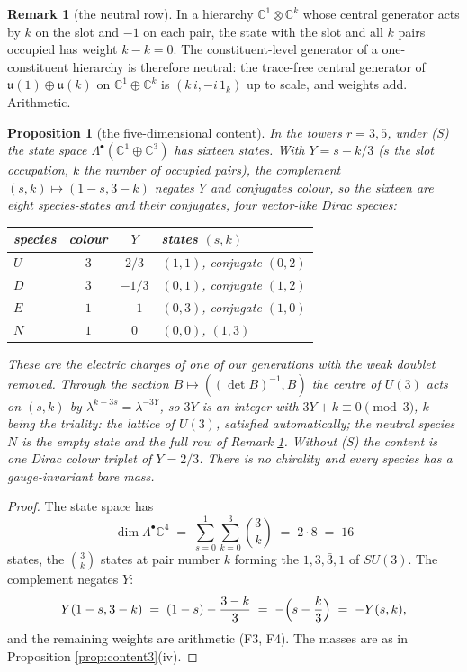 \documentclass[11pt]{article}
\newtheorem{proposition}[theorem]{Proposition}
\theoremstyle{definition}
\newtheorem{remark}[theorem]{Remark}
\newcommand{\C}{\mathbb{C}}
\newcommand{\uu}{\mathfrak{u}}
\begin{document}
\begin{remark}[the neutral row]\label{rem:neutralrow}
In a hierarchy $\C^{1} \otimes \C^{k}$ whose central generator acts by $k$ on the slot and $-1$ on each pair, the state with the slot and all $k$ pairs occupied has weight $k - k = 0$. The constituent-level generator of a one-constituent hierarchy is therefore neutral: the trace-free central generator of $\uu(1) \oplus \uu(k)$ on $\C^{1} \oplus \C^{k}$ is $(k\,i, -i\,1_{k})$ up to scale, and weights add. Arithmetic.
\end{remark}

\begin{proposition}[the five-dimensional content]\label{prop:content5}
In the towers $r = 3, 5$, under (S) the state space $\Lambda^{\bullet}(\C^{1} \oplus \C^{3})$ has sixteen states. With $Y = s - k/3$ ($s$ the slot occupation, $k$ the number of occupied pairs), the complement $(s,k) \mapsto (1-s, 3-k)$ negates $Y$ and conjugates colour, so the sixteen are eight species-states and their conjugates, four vector-like Dirac species:
\begin{center}\small
\begin{tabular}{@{}lccl@{}}
\toprule
species & colour & $Y$ & states $(s,k)$ \\
\midrule
$U$ & $3$ & $2/3$ & $(1,1)$, conjugate $(0,2)$ \\
$D$ & $3$ & $-1/3$ & $(0,1)$, conjugate $(1,2)$ \\
$E$ & $1$ & $-1$ & $(0,3)$, conjugate $(1,0)$ \\
$N$ & $1$ & $0$ & $(0,0)$, $(1,3)$ \\
\bottomrule
\end{tabular}
\end{center}
These are the electric charges of one of our generations with the weak doublet removed. Through the section $B \mapsto ((\det B)^{-1}, B)$ the centre of $U(3)$ acts on $(s,k)$ by $\lambda^{k - 3s} = \lambda^{-3Y}$, so $3Y$ is an integer with $3Y + k \equiv 0 \pmod 3$, $k$ being the triality: the lattice of $U(3)$, satisfied automatically; the neutral species $N$ is the empty state and the full row of Remark \ref{rem:neutralrow}. Without (S) the content is one Dirac colour triplet of $Y = 2/3$. There is no chirality and every species has a gauge-invariant bare mass.
\end{proposition}

\begin{proof}
The state space has
\[
\dim \Lambda^{\bullet}\C^{4} \;=\; \sum_{s=0}^{1}\sum_{k=0}^{3}\binom{3}{k} \;=\; 2 \cdot 8 \;=\; 16
\]
states, the $\binom{3}{k}$ states at pair number $k$ forming the $1, 3, \bar{3}, 1$ of $SU(3)$. The complement negates $Y$:
\[
Y(1 - s, 3 - k) \;=\; (1 - s) - \frac{3 - k}{3} \;=\; -\Bigl(s - \frac{k}{3}\Bigr) \;=\; -Y(s, k),
\]
and the remaining weights are arithmetic (F3, F4). The masses are as in Proposition \ref{prop:content3}(iv).
\end{proof}
\end{document}
